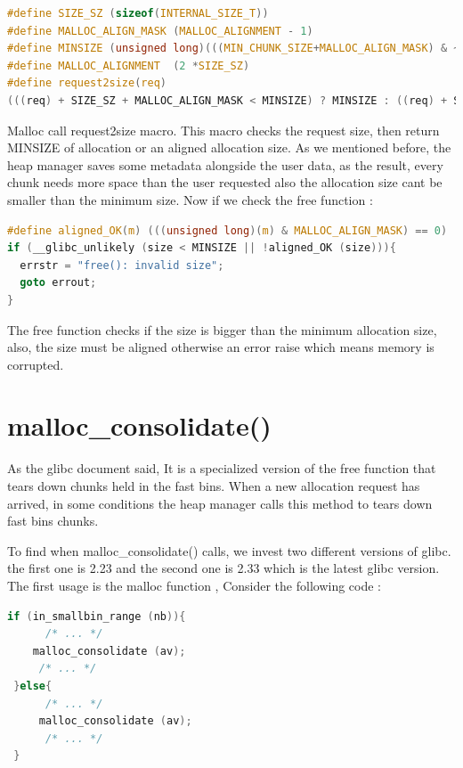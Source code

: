\documentclass{masterthesis}
\newcommand*\libc{glibc}
\newcommand*\fb{fast bins}
\begin{document}
\begin{lstlisting}[language=c,frame=tlrb]
#define SIZE_SZ (sizeof(INTERNAL_SIZE_T))
#define MALLOC_ALIGN_MASK (MALLOC_ALIGNMENT - 1)
#define MINSIZE (unsigned long)(((MIN_CHUNK_SIZE+MALLOC_ALIGN_MASK) & ~MALLOC_ALIGN_MASK))
#define MALLOC_ALIGNMENT  (2 *SIZE_SZ)
#define request2size(req)
(((req) + SIZE_SZ + MALLOC_ALIGN_MASK < MINSIZE) ? MINSIZE : ((req) + SIZE_SZ + MALLOC_ALIGN_MASK) & ~MALLOC_ALIGN_MASK)
\end{lstlisting}

Malloc call request2size macro. This macro checks the request size, then return MINSIZE of allocation or an aligned allocation size. As we mentioned before, the heap manager saves some metadata alongside the user data, as the result, every chunk needs more space than the user requested also the allocation size cant be smaller than the minimum size. Now if we check the free function :

\begin{lstlisting}[language=c,frame=tlrb]
#define aligned_OK(m) (((unsigned long)(m) & MALLOC_ALIGN_MASK) == 0)
if (__glibc_unlikely (size < MINSIZE || !aligned_OK (size))){
  errstr = "free(): invalid size";
  goto errout;
}
\end{lstlisting}

The free function checks if the size is bigger than the minimum allocation size, also, the size must be aligned otherwise an error raise which means memory is corrupted.

\section{malloc\_consolidate()}
As the \libc{} document said, It is a specialized version of the free function that tears down chunks held in the \fb{}. When a new allocation request has arrived, in some conditions the heap manager calls this method to tears down \fb{} chunks. 

To find when malloc\_consolidate() calls, we invest two different versions of \libc{}. the first one is 2.23 and the second one is 2.33 which is the latest \libc{} version. The first usage is the malloc function , Consider the following code :

\begin{lstlisting}[language=c,frame=tlrb]
 if (in_smallbin_range (nb)){
	  /* ... */ 
 	malloc_consolidate (av);
	 /* ... */ 
 }else{
	  /* ... */ 
	 malloc_consolidate (av);
	  /* ... */ 
 }
\end{lstlisting}
\end{document}
